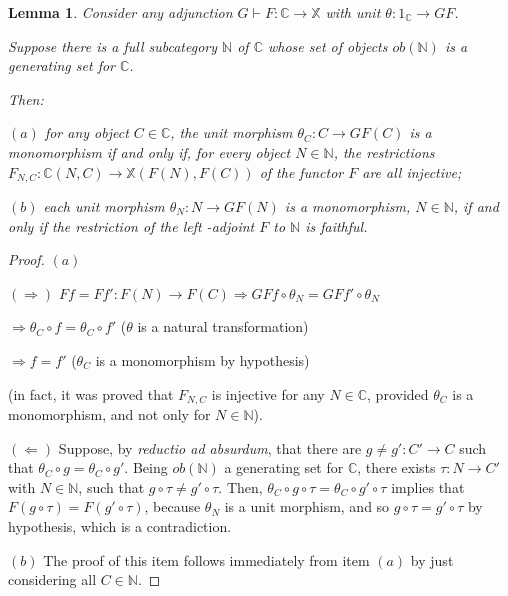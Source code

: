 \documentclass[12pt,a4paper]{amsart}
\newtheorem{lemma}{Lemma}[section]
\theoremstyle{definition}
\begin{document}
\begin{lemma}\label{lemma:ob(N) generating set for C}
Consider any adjunction $G\vdash F:\mathbb{C}\rightarrow \mathbb{X}$ with unit $\theta:1_\mathbb{C}\rightarrow GF$.

Suppose there is a full subcategory $\mathbb{N}$ of $\mathbb{C}$ whose set of objects $ob(\mathbb{N})$ is a generating set for $\mathbb{C}$.

\noindent Then:\vspace{3pt}

\noindent $(a)$ for any object $C\in\mathbb{C}$, the unit morphism $\theta_C:C\rightarrow GF(C)$ is a monomorphism if and only if, for every object $N\in\mathbb{N}$, the restrictions $F_{N,C}: \mathbb{C}(N,C)\rightarrow \mathbb{X}(F(N),F(C))$ of the functor $F$ are all injective;\vspace{3pt}

\noindent $(b)$\cite[Lemma 4.2]{X:concordant&monotone} each unit morphism $\theta_N:N\rightarrow GF(N)$ is a monomorphism, $N\in\mathbb{N}$, if and only if the restriction of the left -adjoint $F$ to $\mathbb{N}$ is faithful.
\end{lemma}
\begin{proof}
\noindent $(a)$\vspace{3pt}

\noindent $(\Rightarrow)$ $Ff=Ff':F(N)\rightarrow F(C) \Rightarrow GFf\circ\theta_N=GFf'\circ\theta_N$

$\Rightarrow\theta_C\circ f=\theta_C\circ f'$ ($\theta$ is a natural transformation)

$\Rightarrow f=f'$ ($\theta_C$ is a monomorphism by hypothesis)

\noindent (in fact, it was proved that $F_{N,C}$ is injective for any $N\in\mathbb{C}$, provided $\theta_C$ is a monomorphism, and not only for $N\in\mathbb{N}$).\vspace{3pt}

\noindent $(\Leftarrow)$ Suppose, by \emph{reductio ad absurdum}, that there are $g\neq g':C'\rightarrow C$ such that $\theta_C\circ g=\theta_C\circ g'$. Being $ob(\mathbb{N})$ a generating set for $\mathbb{C}$, there exists $\tau :N\rightarrow C'$ with $N\in\mathbb{N}$, such that $g\circ\tau\neq g'\circ\tau$. Then, $\theta_C\circ g\circ\tau=\theta_C\circ g'\circ\tau$ implies that $F(g\circ\tau)=F(g'\circ\tau)$, because $\theta_N$ is a unit morphism, and so $g\circ\tau =g'\circ\tau$ by hypothesis, which is a contradiction.\vspace{3pt}

\noindent $(b)$ The proof of this item follows immediately from item $(a)$ by just considering all $C\in \mathbb{N}$.\end{proof}
\end{document}
